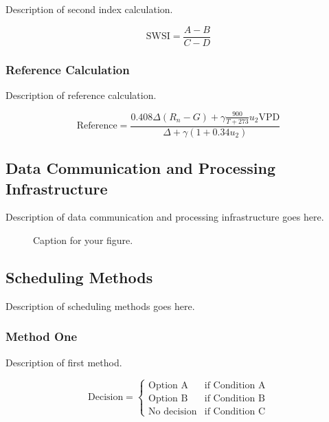 \documentclass[12pt]{article}
\begin{document}
Description of second index calculation.

\begin{equation}
\text{SWSI} = \frac{A - B}{C - D}
\label{eq:index2}
\end{equation}

\subsubsection{Reference Calculation}

Description of reference calculation.

\begin{equation}
\text{Reference} = \frac{0.408\Delta (R_n - G) + \gamma \frac{900}{T + 273} u_2 \text{VPD}}{\Delta + \gamma (1 + 0.34 u_2)}
\label{eq:reference}
\end{equation}

\subsection{Data Communication and Processing Infrastructure}

Description of data communication and processing infrastructure goes here.

\begin{figure}[htbp]
    \centering
    \caption{Caption for your figure.}
    \label{fig:data-flow}
\end{figure}

\subsection{Scheduling Methods}

Description of scheduling methods goes here.

\subsubsection{Method One}

Description of first method.

\begin{equation}
\text{Decision} = \begin{cases}
\text{Option A} & \text{if Condition A} \\
\text{Option B} & \text{if Condition B} \\
\text{No decision} & \text{if Condition C}
\end{cases}
\label{eq:decision_rule1}
\end{equation}
\end{document}
